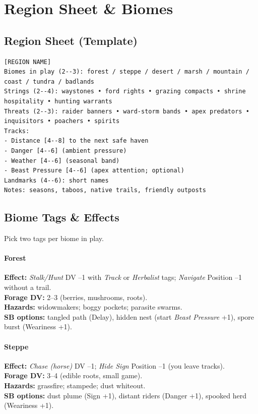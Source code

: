 \documentclass[11pt]{article}
\begin{document}
\tableofcontents
\newpage


\section{Region Sheet \& Biomes}\label{sec:region}
\subsection{Region Sheet (Template)}
\begin{verbatim}
[REGION NAME]
Biomes in play (2--3): forest / steppe / desert / marsh / mountain / coast / tundra / badlands
Strings (2--4): waystones • ford rights • grazing compacts • shrine hospitality • hunting warrants
Threats (2--3): raider banners • ward-storm bands • apex predators • inquisitors • poachers • spirits
Tracks:
- Distance [4--8] to the next safe haven
- Danger [4--6] (ambient pressure)
- Weather [4--6] (seasonal band)
- Beast Pressure [4--6] (apex attention; optional)
Landmarks (4--6): short names
Notes: seasons, taboos, native trails, friendly outposts
\end{verbatim}

\subsection{Biome Tags \& Effects}
Pick two tags per biome in play.

\paragraph{Forest}
\textbf{Effect:} \emph{Stalk/Hunt} DV --1 with \emph{Track} or \emph{Herbalist} tags; \emph{Navigate} Position --1 without a trail.\\
\textbf{Forage DV:} 2--3 (berries, mushrooms, roots).\\
\textbf{Hazards:} widowmakers; boggy pockets; parasite swarms.\\
\textbf{SB options:} tangled path (Delay), hidden nest (start \emph{Beast Pressure} +1), spore burst (Weariness +1).

\paragraph{Steppe}
\textbf{Effect:} \emph{Chase (horse)} DV --1; \emph{Hide Sign} Position --1 (you leave tracks).\\
\textbf{Forage DV:} 3--4 (edible roots, small game).\\
\textbf{Hazards:} grassfire; stampede; dust whiteout.\\
\textbf{SB options:} dust plume (Sign +1), distant riders (Danger +1), spooked herd (Weariness +1).
\end{document}
